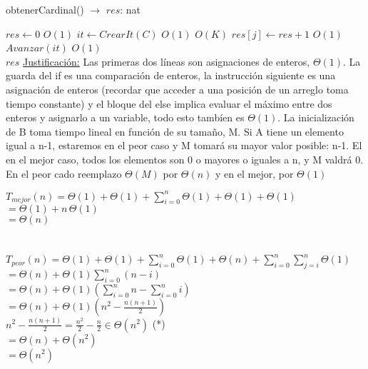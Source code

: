 \documentclass[10pt, a4paper]{article}
\begin{document}
\begin{algorithm}[H]{obtenerCardinal() $\to$ $res$: nat}	
	\begin{algorithmic}[1]
			\State $res \gets 0$			\Comment $O(1)$
    		\State $it \gets CrearIt(C)$	\Comment $O(1)$
    					\Comment $O(K)$
			 	\State $res[j]\gets res+1$	\Comment $O(1)$
			 	\State $Avanzar(it)$	\Comment $O(1)$
			 \EndWhile \\
			\Return $res$
		\medskip
		\Statex \underline{Justificación:} Las primeras dos líneas son asignaciones de enteros, $\Theta(1)$. La guarda del if es una comparación de enteros, la instrucción siguiente es una asignación de enteros (recordar que acceder a una posición de un arreglo toma tiempo constante) y el bloque del else implica evaluar el máximo entre dos enteros y asignarlo a un variable, todo esto tambíen es $\Theta(1)$. La inicialización de B toma tiempo lineal en función de su tamaño, M.
		Si A tiene un elemento igual a n-1, estaremos en el peor caso y M tomará su mayor valor posible: n-1. El en el mejor caso, todos los elementos son 0 o mayores o iguales a n, y M valdrá 0. En el peor cado reemplazo $\Theta(M)$ por $\Theta(n)$ y en el mejor, por $\Theta(1)$
    \end{algorithmic}
\end{algorithm}	

$T_{mejor}(n) = \Theta (1) + \Theta (1) + \sum_{i=0}^{n} \Theta (1) +\Theta (1) + \Theta (1)$\\
 $= \Theta (1) + n \, \Theta (1)$\\
 $= \Theta (n)$\\ \\ \\
 
$T_{peor}(n) = \Theta (1) + \Theta (1) + \sum_{i=0}^{n} \Theta (1) +\Theta (n) + \sum_{i=0}^{n} \sum_{j=i}^{n} \Theta (1)$\\
$= \Theta (n) +\Theta (1) \sum_{i=0}^{n}(n-i)$ \\
$= \Theta (n) +\Theta (1) (\sum_{i=0}^{n}n - \sum_{i=0}^{n}i)$\\
$= \Theta (n) +\Theta (1) (n^2 - \frac{n(n+1)}{2})$\\
$n^2 - \frac{n(n+1)}{2} = \frac{n^2}{2} - \frac{n}{2} \in \Theta (n^2)$ (*)\\
$= \Theta (n) +\Theta (n^2)$\\
$=\Theta (n^2)$\\ \\
\end{document}
